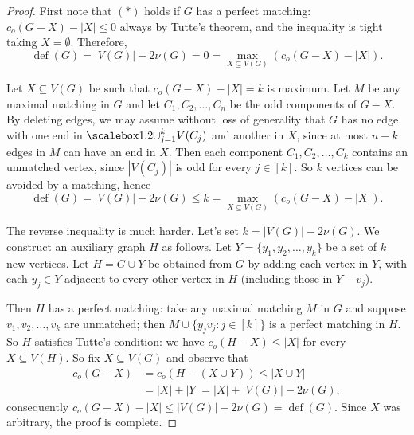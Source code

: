 \begin{proof}
First note that \((\ast)\) holds if \( G \) has a perfect matching: \( c_{o} (G - X) - |X| \leq 0 \) always by Tutte's theorem, and the inequality is tight taking \( X = \emptyset  \). Therefore, \[ \operatorname{def} (G) = |V(G)| - 2 \nu (G) = 0 =  \max_{X \subseteq V(G)} (c_{o} (G - X) - |X|).  \] 

Let \( X \subseteq V(G) \) be such that \( c_{o} (G - X) - |X| = k \) is maximum. Let \( M \) be any maximal matching in \( G \) and let \( C_1, C_2, \hdots , C_{n}  \) be the odd components of \( G - X \). By deleting edges, we may assume without loss of generality that \( G \) has no edge with one end in \( \medcup_{j=1} ^{k} V(C_{j}) \) and another in \( X \), since at most \( n - k \) edges in \( M \) can have an end in \( X \). Then each component \( C_1, C_2, \hdots , C_{k}  \) contains an unmatched vertex, since \( |V(C_{j})| \) is odd for every \( j \in [k] \). So \( k \) vertices can be avoided by a matching, hence \[\operatorname{def} (G) = |V(G)| - 2\nu (G) \leq k = \max _{X \subseteq V(G)} (c_{o} (G - X) - |X|). \] 

The reverse inequality is much harder. Let's set \( k = |V(G)| - 2\nu (G) \). We construct an auxiliary graph \( H \) as follows. Let \( Y = \{ y_1, y_2, \hdots , y_{k}  \}  \) be a set of \( k \) new vertices. Let \( H = G \cup Y \) be obtained from \( G \) by adding each vertex in \( Y \), with each \( y_{j} \in Y \) adjacent to every other vertex in \( H \) (including those in \( Y - v_{j}  \)). 

Then \( H \) has a perfect matching: take any maximal matching \( M \) in \( G \) and suppose \( v_1, v_2, \hdots , v_{k}  \) are unmatched; then \( M \cup \{ y_{j}v_{j} : j \in [k] \}  \) is a perfect matching in \( H \). So \( H \) satisfies Tutte's condition: we have \( c_{o} (H - X) \leq |X| \) for every \( X \subseteq V(H) \). So fix \( X \subseteq V(G) \) and observe that
\begin{align*}
	c_{o} (G - X) &= c_{o} (H - (X \cup Y)) \leq |X \cup Y| \\ 
		      &= |X| + |Y| = |X| + |V(G)| - 2 \nu (G),
\end{align*}
consequently \( c_{o} (G-X) - |X| \leq |V(G)| - 2 \nu (G) = \operatorname{def} (G) \). Since \( X \) was arbitrary, the proof is complete.
\end{proof}
